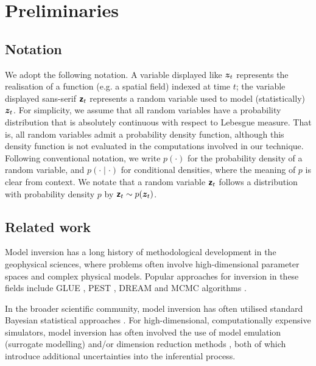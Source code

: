 \section{Preliminaries}

\subsection{Notation}
We adopt the following notation. A variable displayed like $\boldsymbol{z}_{t}$ represents the realisation of a function (e.g. a spatial field) indexed at time $t$; the variable displayed sans-serif $\boldsymbol{\mathsf{z}}_{t}$ represents a random variable used to model (statistically) $\boldsymbol{z}_{t}$.
For simplicity, we assume that all random variables have a probability distribution that is absolutely continuous with respect to Lebesgue measure.
That is, all random variables admit a probability density function, although this density function is not evaluated in the computations involved in our technique.
Following conventional notation, we write $p(\cdot)$ for the probability density of a random variable, and $p(\cdot \mid \cdot)$ for conditional densities, where the meaning of $p$ is clear from context.
We notate that a random variable $\boldsymbol{\mathsf{z}}_t$ follows a distribution with probability density $p$ by $\boldsymbol{\mathsf{z}}_t \sim p(\boldsymbol{z}_t)$.

\subsection{Related work}

Model inversion has a long history of methodological development in the geophysical sciences, where problems often involve high-dimensional parameter spaces and complex physical models.  Popular approaches for inversion in these fields include GLUE \cite{Beven2014}, PEST \cite{Doherty2010}, DREAM \cite{Vrugt2011} and MCMC algorithms \cite{Oh2001}.

In the broader scientific community, model inversion has often utilised standard Bayesian statistical approaches \cite{StuartInverse2010,DashtiBayesian2015,TarantolaInverse2005}.  For high-dimensional, computationally expensive simulators, model inversion has often involved the use of model emulation (surrogate modelling) \cite{Hooten2011FirstOrder, GramacyLocal2015, Gopalan2021HOSVD, ColeLocallyInduced2021} and/or dimension reduction methods \cite{Higdon2008SVDEmulator, SiadeSnapshot2010, Grana2019}, both of which introduce additional uncertainties into the inferential process.

